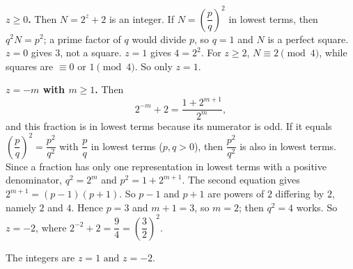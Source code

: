 \textbf{$z\ge0$.} Then $N=2^z+2$ is an integer. If $N=\left(\dfrac {p}{q}\right)^2$ in lowest terms, then $q^2N=p^2$; a prime factor of $q$ would divide $p$, so $q=1$ and $N$ is a perfect square. $z=0$ gives $3$, not a square. $z=1$ gives $4=2^2$. For $z\ge2$, $N\equiv2\pmod4$, while squares are $\equiv0$ or $1\pmod4$. So only $z=1$.

\textbf{$z=-m$ with $m\ge1$.} Then
\[
2^{-m}+2=\dfrac{1+2^{m+1}}{2^m},
\]
and this fraction is in lowest terms because its numerator is odd. If it equals $\left(\dfrac {p}{q}\right)^2=\dfrac{p^2}{q^2}$ with $\dfrac {p}{q}$ in lowest terms ($p,q>0$), then $\dfrac{p^2}{q^2}$ is also in lowest terms. Since a fraction has only one representation in lowest terms with a positive denominator, $q^2=2^m$ and $p^2=1+2^{m+1}$. The second equation gives $2^{m+1}=(p-1)(p+1)$. So $p-1$ and $p+1$ are powers of $2$ differing by $2$, namely $2$ and $4$. Hence $p=3$ and $m+1=3$, so $m=2$; then $q^2=4$ works. So $z=-2$, where $2^{-2}+2=\dfrac{9}{4}=\left(\dfrac{3}{2}\right)^2$.

The integers are $\boxed{z=1\text{ and }z=-2}$.
